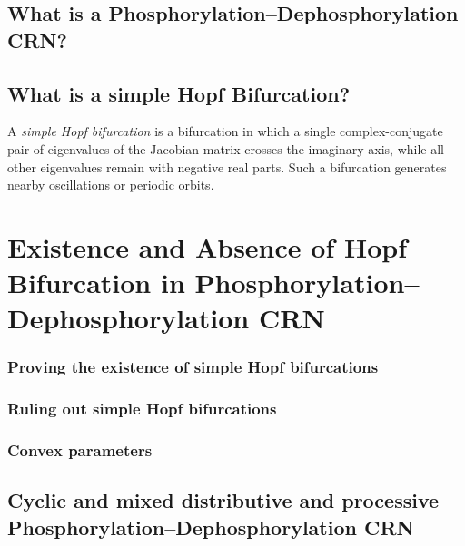 \section{What is a Phosphorylation–Dephosphorylation CRN?}

\section{What is a simple Hopf Bifurcation?}
A \textit{simple Hopf bifurcation} is a bifurcation in which a single complex-conjugate pair of eigenvalues of the Jacobian matrix crosses the imaginary axis, while all other eigenvalues remain with negative real parts. Such a bifurcation generates nearby oscillations or periodic orbits.

\chapter{Existence and Absence of Hopf Bifurcation in Phosphorylation–Dephosphorylation CRN}

\subsection{Proving the existence of simple Hopf bifurcations}

\subsection{Ruling out simple Hopf bifurcations}

\subsection{Convex parameters}

\section{Cyclic and mixed distributive and processive Phosphorylation–Dephosphorylation CRN}